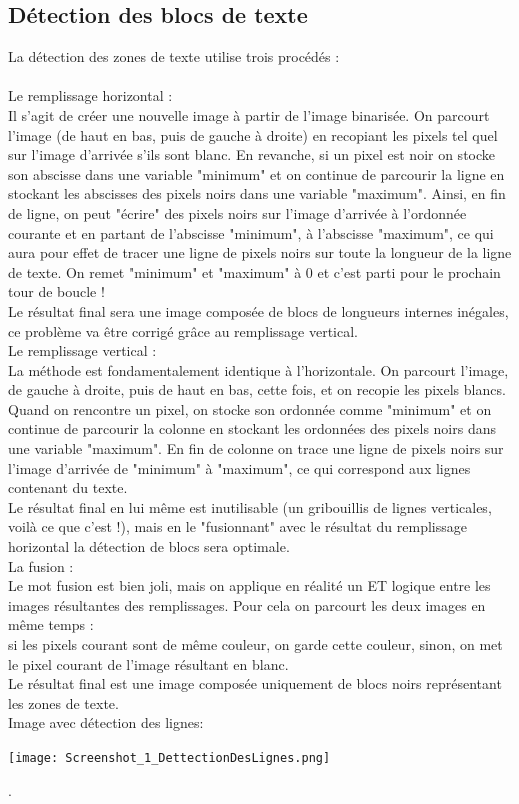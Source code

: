 \documentclass [french,12pt]{article}
\begin{document}
\subsection{Détection des blocs de texte}

La détection des zones de texte utilise trois procédés :
\\
\\
Le remplissage horizontal :
\\
            Il s'agit de créer une nouvelle image à partir de l'image binarisée. On parcourt l'image (de haut en bas, puis de gauche à droite) en recopiant les pixels tel quel sur l'image d'arrivée s'ils sont blanc. En revanche, si un pixel est noir on stocke son abscisse dans une variable "minimum" et on continue de parcourir la ligne en stockant les abscisses des pixels noirs dans une variable "maximum". Ainsi, en fin de ligne, on peut "écrire" des pixels noirs sur l'image d'arrivée à l'ordonnée courante et en partant de l'abscisse "minimum", à l'abscisse "maximum", ce qui aura pour effet de tracer une ligne de pixels noirs sur toute la longueur de la ligne de texte. On remet "minimum" et "maximum" à 0 et c'est parti pour le prochain tour de boucle !
\\
	Le résultat final sera une image composée de blocs de longueurs internes inégales, ce problème va être corrigé grâce au remplissage vertical.
\\
Le remplissage vertical :
\\
            La méthode est fondamentalement identique à l'horizontale. On parcourt l'image, de gauche à droite, puis de haut en bas, cette fois, et on recopie les pixels blancs. Quand on rencontre un pixel, on stocke son ordonnée comme "minimum" et on continue de parcourir la colonne en stockant les ordonnées des pixels noirs dans une variable "maximum". En fin de colonne on trace une ligne de pixels noirs sur l'image d'arrivée de "minimum" à "maximum", ce qui correspond aux lignes contenant du texte. 
\\
            Le résultat final en lui même est inutilisable (un gribouillis de lignes verticales, voilà ce que c'est !), mais en le "fusionnant" avec le résultat du remplissage horizontal la détection de blocs sera optimale.
\\
La fusion :
\\
           Le mot fusion est bien joli, mais on applique en réalité un ET logique entre les images résultantes des remplissages.
           Pour cela on parcourt les deux images en même temps :
\\
                    si les pixels courant sont de même couleur, on garde cette couleur,
                    sinon, on met le pixel courant de l'image résultant en blanc.
\\
Le résultat final est une image composée uniquement de blocs noirs représentant les zones de texte.
\\
Image avec détection des lignes:
\\
\begin{center} \texttt{[image: Screenshot\_1\_DettectionDesLignes.png]} \end{center}.
\\
\end{document}
